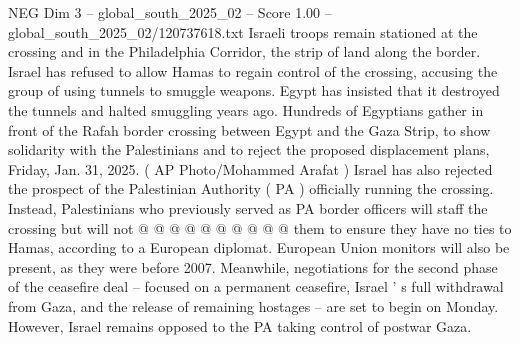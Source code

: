 \begin{textsample}{NEG Dim 3 – global\_south\_2025\_02 – Score 1.00 – global\_south\_2025\_02/120737618.txt}
Israeli troops remain stationed at the crossing and in the Philadelphia Corridor, the strip of land along the border.
Israel has refused to allow Hamas to regain control of the crossing, accusing the group of using tunnels to smuggle weapons.
Egypt has insisted that it destroyed the tunnels and halted smuggling years ago.
Hundreds of Egyptians gather in front of the Rafah border crossing between Egypt and the Gaza Strip, to show solidarity with the Palestinians and to reject the proposed displacement plans, Friday, Jan. 31, 2025. ( AP Photo/Mohammed Arafat ) Israel has also rejected the prospect of the Palestinian Authority ( PA ) officially running the crossing.
Instead, Palestinians who previously served as PA border officers will staff the crossing but will not @ @ @ @ @ @ @ @ @ @ them to ensure they have no ties to Hamas, according to a European diplomat.
European Union monitors will also be present, as they were before 2007.
Meanwhile, negotiations for the second phase of the ceasefire deal -- focused on a permanent ceasefire, Israel ' s full withdrawal from Gaza, and the release of remaining hostages -- are set to begin on Monday.
However, Israel remains opposed to the PA taking control of postwar Gaza.

\end{textsample}
